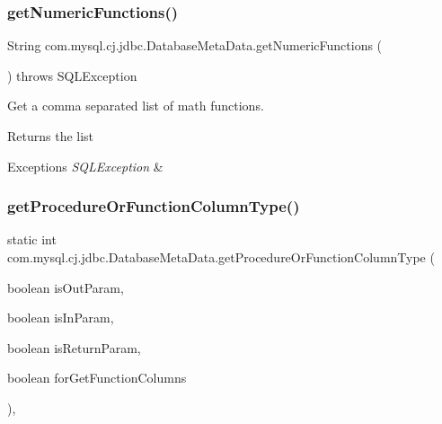 \subsubsection{\texorpdfstring{get\+Numeric\+Functions()}{getNumericFunctions()}}
{\footnotesize\ttfamily String com.\+mysql.\+cj.\+jdbc.\+Database\+Meta\+Data.\+get\+Numeric\+Functions (\begin{DoxyParamCaption}{ }\end{DoxyParamCaption}) throws S\+Q\+L\+Exception}

Get a comma separated list of math functions.

\begin{DoxyReturn}{Returns}
the list 
\end{DoxyReturn}

\begin{DoxyExceptions}{Exceptions}
{\em S\+Q\+L\+Exception} & \\
\hline
\end{DoxyExceptions}
\mbox{\label{classcom_1_1mysql_1_1cj_1_1jdbc_1_1_database_meta_data_a3e763c50539692ca2f6c0c987cec3fca}} 
\subsubsection{\texorpdfstring{get\+Procedure\+Or\+Function\+Column\+Type()}{getProcedureOrFunctionColumnType()}}
{\footnotesize\ttfamily static int com.\+mysql.\+cj.\+jdbc.\+Database\+Meta\+Data.\+get\+Procedure\+Or\+Function\+Column\+Type (\begin{DoxyParamCaption}\item[{boolean}]{is\+Out\+Param,  }\item[{boolean}]{is\+In\+Param,  }\item[{boolean}]{is\+Return\+Param,  }\item[{boolean}]{for\+Get\+Function\+Columns }\end{DoxyParamCaption})\hspace{0.3cm}{\ttfamily [static]}, {\ttfamily [protected]}}

